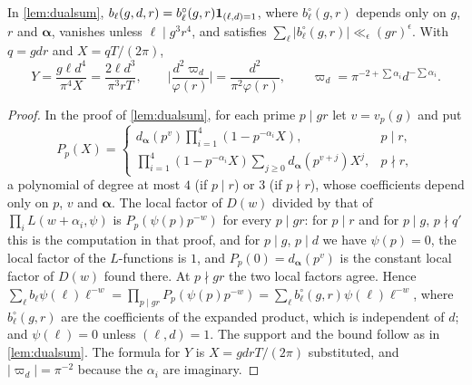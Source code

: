 \documentclass[11pt,colorlinks]{charlie}
\begin{document}
\begin{lemma}\label{lem:labels}
In \cref{lem:dualsum}, $b_\ell(g,d,r)=b^\circ_\ell(g,r)\mathbf{1}_{(\ell,d)=1}$, where $b^\circ_\ell(g,r)$ depends only on $g$, $r$ and $\boldsymbol\alpha$, vanishes unless $\ell\mid g^3r^4$, and satisfies $\sum_\ell|b^\circ_\ell(g,r)|\ll_\epsilon(gr)^\epsilon$. With $q=gdr$ and $X=qT/(2\pi)$,
\[
 Y=\frac{g\ell d^4}{\pi^4X}=\frac{2\ell d^3}{\pi^3rT},\qquad\Big|\frac{d^2\varpi_d}{\varphi(r)}\Big|=\frac{d^2}{\pi^2\varphi(r)},\qquad\varpi_d=\pi^{-2+\sum\alpha_i}d^{-\sum\alpha_i}.
\]
\end{lemma}
\begin{proof}
In the proof of \cref{lem:dualsum}, for each prime $p\mid gr$ let $v=v_p(g)$ and put
\[
 P_p(X)=\begin{cases}d_{\boldsymbol\alpha}(p^v)\prod_{i=1}^4(1-p^{-\alpha_i}X), & p\mid r,\\[2pt]
 \prod_{i=1}^4(1-p^{-\alpha_i}X)\sum_{j\ge0}d_{\boldsymbol\alpha}(p^{v+j})X^j, & p\nmid r,\end{cases}
\]
a polynomial of degree at most $4$ (if $p\mid r$) or $3$ (if $p\nmid r$), whose coefficients depend only on $p$, $v$ and $\boldsymbol\alpha$. The local factor of $D(w)$ divided by that of $\prod_iL(w+\alpha_i,\psi)$ is $P_p(\psi(p)p^{-w})$ for every $p\mid gr$: for $p\mid r$ and for $p\mid g$, $p\nmid q'$ this is the computation in that proof, and for $p\mid g$, $p\mid d$ we have $\psi(p)=0$, the local factor of the $L$-functions is $1$, and $P_p(0)=d_{\boldsymbol\alpha}(p^v)$ is the constant local factor of $D(w)$ found there. At $p\nmid gr$ the two local factors agree. Hence $\sum_\ell b_\ell\psi(\ell)\ell^{-w}=\prod_{p\mid gr}P_p(\psi(p)p^{-w})=\sum_\ell b^\circ_\ell(g,r)\psi(\ell)\ell^{-w}$, where $b^\circ_\ell(g,r)$ are the coefficients of the expanded product, which is independent of $d$; and $\psi(\ell)=0$ unless $(\ell,d)=1$. The support and the bound follow as in \cref{lem:dualsum}. The formula for $Y$ is $X=gdrT/(2\pi)$ substituted, and $|\varpi_d|=\pi^{-2}$ because the $\alpha_i$ are imaginary.
\end{proof}
\end{document}
